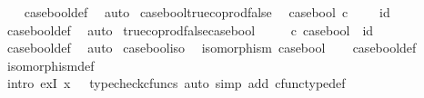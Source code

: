 \begin{isabellebody}
%
\isadelimproof
\ \ %
\endisadelimproof
%
\isatagproof
{}\isamarkupfalse%
\ case{\isacharunderscore}{\kern0pt}bool{\isacharunderscore}{\kern0pt}def{}\ \isamarkupfalse%
\ auto%
\endisatagproof
{\isafoldproof}%
%
\isadelimproof
\isanewline
%
\endisadelimproof
\isanewline
{}\isamarkupfalse%
\ case{\isacharunderscore}{\kern0pt}bool{\isacharunderscore}{\kern0pt}true{\isacharunderscore}{\kern0pt}coprod{\isacharunderscore}{\kern0pt}false{\isacharcolon}{\kern0pt}\isanewline
\ \ {\isachardoublequoteopen}case{\isacharunderscore}{\kern0pt}bool\ {\isasymcirc}\isactrlsub c\ {\isacharparenleft}{\kern0pt}{\isasymt}\ {\isasymamalg}\ {\isasymf}{\isacharparenright}{\kern0pt}\ {\isacharequal}{\kern0pt}\ id\ {\isacharparenleft}{\kern0pt}{\isasymone}\ {\isasymCoprod}\ {\isasymone}{\isacharparenright}{\kern0pt}{\isachardoublequoteclose}\isanewline
%
\isadelimproof
\ \ %
\endisadelimproof
%
\isatagproof
{}\isamarkupfalse%
\ case{\isacharunderscore}{\kern0pt}bool{\isacharunderscore}{\kern0pt}def{}\ \isamarkupfalse%
\ auto%
\endisatagproof
{\isafoldproof}%
%
\isadelimproof
\isanewline
%
\endisadelimproof
\isanewline
{}\isamarkupfalse%
\ true{\isacharunderscore}{\kern0pt}coprod{\isacharunderscore}{\kern0pt}false{\isacharunderscore}{\kern0pt}case{\isacharunderscore}{\kern0pt}bool{\isacharcolon}{\kern0pt}\isanewline
\ \ {\isachardoublequoteopen}{\isacharparenleft}{\kern0pt}{\isasymt}\ {\isasymamalg}\ {\isasymf}{\isacharparenright}{\kern0pt}\ {\isasymcirc}\isactrlsub c\ case{\isacharunderscore}{\kern0pt}bool\ {\isacharequal}{\kern0pt}\ id\ {\isasymOmega}{\isachardoublequoteclose}\isanewline
%
\isadelimproof
\ \ %
\endisadelimproof
%
\isatagproof
{}\isamarkupfalse%
\ case{\isacharunderscore}{\kern0pt}bool{\isacharunderscore}{\kern0pt}def{}\ \isamarkupfalse%
\ auto%
\endisatagproof
{\isafoldproof}%
%
\isadelimproof
\isanewline
%
\endisadelimproof
\isanewline
{}\isamarkupfalse%
\ case{\isacharunderscore}{\kern0pt}bool{\isacharunderscore}{\kern0pt}iso{\isacharcolon}{\kern0pt}\isanewline
\ \ {\isachardoublequoteopen}isomorphism\ case{\isacharunderscore}{\kern0pt}bool{\isachardoublequoteclose}\isanewline
%
\isadelimproof
\ \ %
\endisadelimproof
%
\isatagproof
{}\isamarkupfalse%
\ case{\isacharunderscore}{\kern0pt}bool{\isacharunderscore}{\kern0pt}def{}\ \isamarkupfalse%
\ isomorphism{\isacharunderscore}{\kern0pt}def\isanewline
\ \ \isamarkupfalse%
\ {\isacharparenleft}{\kern0pt}intro\ exI{\isacharbrackleft}{\kern0pt}\ x{\isacharequal}{\kern0pt}{\isachardoublequoteopen}{\isasymt}\ {\isasymamalg}\ {\isasymf}{\isachardoublequoteclose}{\isacharbrackright}{\kern0pt}{\isacharcomma}{\kern0pt}\ typecheck{\isacharunderscore}{\kern0pt}cfuncs{\isacharcomma}{\kern0pt}\ auto\ simp\ add{\isacharcolon}{\kern0pt}\ cfunc{\isacharunderscore}{\kern0pt}type{\isacharunderscore}{\kern0pt}def{\isacharparenright}{\kern0pt}%

\end{isabellebody}
